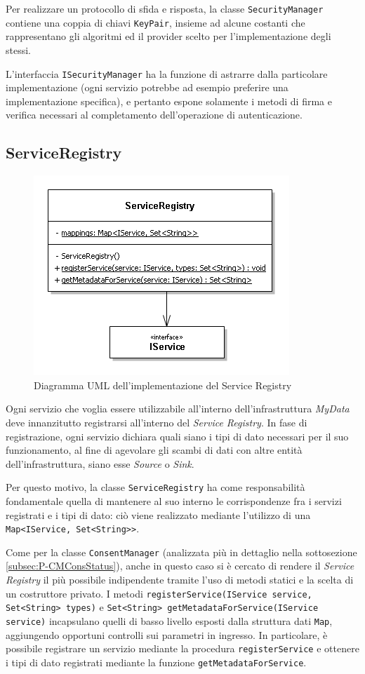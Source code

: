 Per realizzare un protocollo di sfida e risposta, la classe \texttt{SecurityManager} contiene una coppia di chiavi \texttt{KeyPair}, insieme ad alcune costanti che rappresentano gli algoritmi ed il provider scelto per l'implementazione degli stessi.

L'interfaccia \texttt{ISecurityManager} ha la funzione di astrarre dalla particolare implementazione (ogni servizio potrebbe ad esempio preferire una implementazione specifica), e pertanto espone solamente i metodi di firma e verifica necessari al completamento dell'operazione di autenticazione.

\subsection{ServiceRegistry}
\label{subsec:P-serviceregistry}
\begin{figure} [h]
	\centering
	\includegraphics[width=0.5\linewidth]{pictures/ServiceRegistry.png}
	\caption{Diagramma UML dell'implementazione del Service Registry}
	\label{fig:ServiceRegistry}
\end{figure}
Ogni servizio che voglia essere utilizzabile all’interno dell’infrastruttura \textit{MyData} deve innanzitutto registrarsi all’interno del \textit{Service Registry}. In fase di registrazione, ogni servizio dichiara quali siano i tipi di dato necessari per il suo funzionamento, al fine di agevolare gli scambi di dati con altre entit\`a dell’infrastruttura, siano esse \textit{Source} o \textit{Sink}.

Per questo motivo, la classe \texttt{ServiceRegistry} ha come responsabilit\`a fondamentale quella di mantenere al suo interno le corrispondenze fra i servizi registrati e i tipi di dato: ci\`o viene realizzato mediante l’utilizzo di una \texttt{Map<IService, Set<String>{}>}.

Come per la classe \texttt{ConsentManager} (analizzata pi\`u in dettaglio nella sottosezione \ref{subsec:P-CMConsStatus}), anche in questo caso si \`e cercato di rendere il \textit{Service Registry} il pi\`u possibile indipendente tramite l’uso di metodi statici e la scelta di un costruttore privato. I metodi \texttt{registerService(IService service, Set<String> types)} e \texttt{Set<String> getMetadataForService(IService service)} incapsulano quelli di basso livello esposti dalla struttura dati \texttt{Map}, aggiungendo opportuni controlli sui parametri in ingresso. In particolare, \`e possibile registrare un servizio mediante la procedura \texttt{registerService} e ottenere i tipi di dato registrati mediante la funzione \texttt{getMetadataForService}.

